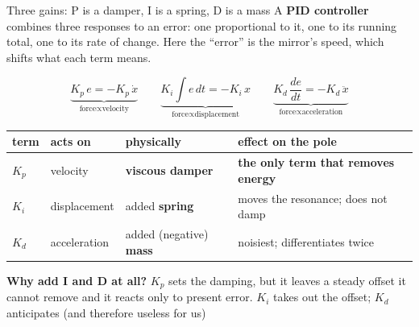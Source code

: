 \documentclass[aspectratio=169]{beamer}
\begin{document}
\begin{frame}{Three gains: P is a damper, I is a spring, D is a mass}
  \centering
  {\footnotesize A \textbf{PID controller} combines three responses to an error:
  one proportional to it, one to its running total, one to its rate of change.
  Here the ``error'' is the mirror's speed, which shifts what each term means.}

  \vspace{1mm}
  \[
    \underbrace{K_p\,e = -K_p\,\dot{x}}_{\text{force} \propto \text{velocity}}
    \qquad
    \underbrace{K_i\!\int\! e\,dt = -K_i\,x}_{\text{force} \propto \text{displacement}}
    \qquad
    \underbrace{K_d\,\frac{de}{dt} = -K_d\,\ddot{x}}_{\text{force} \propto \text{acceleration}}
  \]
  \vspace{1mm}
  {\footnotesize
  \begin{tabular}{@{}llll@{}}
    \toprule
    term & acts on & physically & effect on the pole \\
    \midrule
    $K_p$ & velocity & \textbf{viscous damper} & \alert{\textbf{the only term that removes energy}} \\
    $K_i$ & displacement & added \textbf{spring} & moves the resonance; does not damp \\
    $K_d$ & acceleration & added (negative) \textbf{mass} & noisiest; differentiates twice \\
    \bottomrule
  \end{tabular}}

  \vspace{3mm}
  \begin{minipage}{0.9\textwidth}
  \footnotesize
  \textbf{Why add I and D at all?} $K_p$ sets the damping, but it leaves a steady
  offset it cannot remove and it reacts only to present error. $K_i$ takes out the
  offset; $K_d$ anticipates (and therefore useless for us)

  \end{minipage}
\end{frame}
\end{document}
